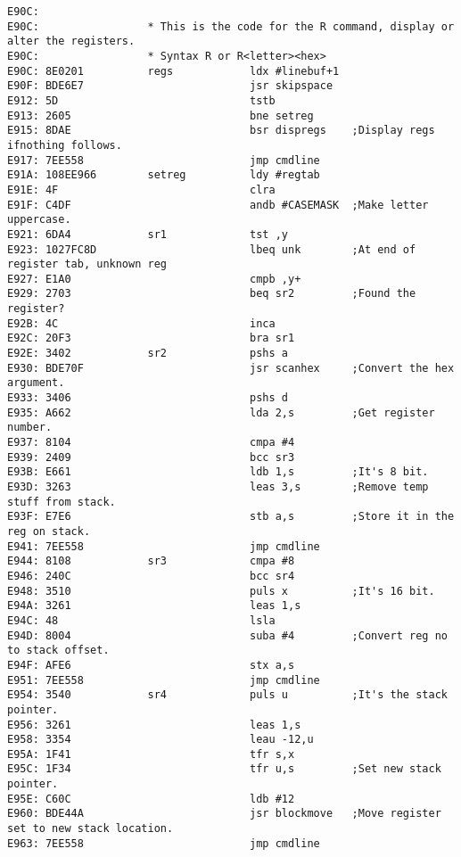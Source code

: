 {\begin{verbatim}
E90C:                 
E90C:                 * This is the code for the R command, display or alter the registers.
E90C:                 * Syntax R or R<letter><hex>    
E90C: 8E0201          regs            ldx #linebuf+1
E90F: BDE6E7                          jsr skipspace
E912: 5D                              tstb
E913: 2605                            bne setreg              
E915: 8DAE                            bsr dispregs    ;Display regs ifnothing follows.
E917: 7EE558                          jmp cmdline
E91A: 108EE966        setreg          ldy #regtab     
E91E: 4F                              clra
E91F: C4DF                            andb #CASEMASK  ;Make letter uppercase.
E921: 6DA4            sr1             tst ,y
E923: 1027FC8D                        lbeq unk        ;At end of register tab, unknown reg
E927: E1A0                            cmpb ,y+
E929: 2703                            beq sr2         ;Found the register?
E92B: 4C                              inca
E92C: 20F3                            bra sr1         
E92E: 3402            sr2             pshs a
E930: BDE70F                          jsr scanhex     ;Convert the hex argument.
E933: 3406                            pshs d
E935: A662                            lda 2,s         ;Get register number.
E937: 8104                            cmpa #4
E939: 2409                            bcc sr3         
E93B: E661                            ldb 1,s         ;It's 8 bit.            
E93D: 3263                            leas 3,s        ;Remove temp stuff from stack.
E93F: E7E6                            stb a,s         ;Store it in the reg on stack.
E941: 7EE558                          jmp cmdline
E944: 8108            sr3             cmpa #8
E946: 240C                            bcc sr4         
E948: 3510                            puls x          ;It's 16 bit.
E94A: 3261                            leas 1,s
E94C: 48                              lsla
E94D: 8004                            suba #4         ;Convert reg no to stack offset.
E94F: AFE6                            stx a,s
E951: 7EE558                          jmp cmdline
E954: 3540            sr4             puls u          ;It's the stack pointer.
E956: 3261                            leas 1,s
E958: 3354                            leau -12,u      
E95A: 1F41                            tfr s,x
E95C: 1F34                            tfr u,s         ;Set new stack pointer.
E95E: C60C                            ldb #12
E960: BDE44A                          jsr blockmove   ;Move register set to new stack location.
E963: 7EE558                          jmp cmdline                             

\end{verbatim}}
